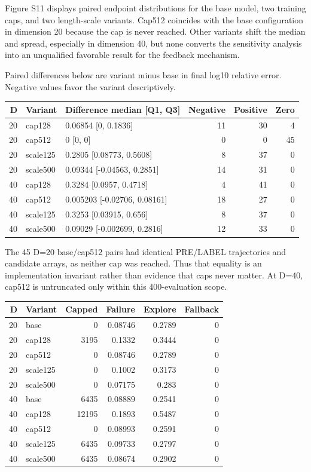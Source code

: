 \documentclass[cmc,article,submit,moreauthors,pdftex]{Definitions/tsp}
\begin{document}
Figure S11 displays paired endpoint distributions for the base model, two training caps, and two length-scale variants. Cap512 coincides with the base configuration in dimension 20 because the cap is never reached. Other variants shift the median and spread, especially in dimension 40, but none converts the sensitivity analysis into an unqualified favorable result for the feedback mechanism.

Paired differences below are variant minus base in final log10 relative error. Negative values favor the variant descriptively.

\begin{longtable}[]{@{}rllrrr@{}}
\toprule
D & Variant & Difference median {[}Q1, Q3{]} & Negative & Positive & Zero \\
\midrule
\endhead
20 & cap128 & 0.06854 {[}0, 0.1836{]} & 11 & 30 & 4 \\
20 & cap512 & 0 {[}0, 0{]} & 0 & 0 & 45 \\
20 & scale125 & 0.2805 {[}0.08773, 0.5608{]} & 8 & 37 & 0 \\
20 & scale500 & 0.09344 {[}-0.04563, 0.2851{]} & 14 & 31 & 0 \\
40 & cap128 & 0.3284 {[}0.0957, 0.4718{]} & 4 & 41 & 0 \\
40 & cap512 & 0.005203 {[}-0.02706, 0.08161{]} & 18 & 27 & 0 \\
40 & scale125 & 0.3253 {[}0.03915, 0.656{]} & 8 & 37 & 0 \\
40 & scale500 & 0.09029 {[}-0.002699, 0.2816{]} & 12 & 33 & 0 \\
\bottomrule
\end{longtable}

The 45 D=20 base/cap512 pairs had identical PRE/LABEL trajectories and candidate arrays, as neither cap was reached. Thus that equality is an implementation invariant rather than evidence that caps never matter. At D=40, cap512 is untruncated only within this 400-evaluation scope.

\begin{longtable}[]{@{}rlrrrr@{}}
\toprule
D & Variant & Capped & Failure & Explore & Fallback \\
\midrule
\endhead
20 & base & 0 & 0.08746 & 0.2789 & 0 \\
20 & cap128 & 3195 & 0.1332 & 0.3444 & 0 \\
20 & cap512 & 0 & 0.08746 & 0.2789 & 0 \\
20 & scale125 & 0 & 0.1002 & 0.3173 & 0 \\
20 & scale500 & 0 & 0.07175 & 0.283 & 0 \\
40 & base & 6435 & 0.08889 & 0.2541 & 0 \\
40 & cap128 & 12195 & 0.1893 & 0.5487 & 0 \\
40 & cap512 & 0 & 0.08993 & 0.2591 & 0 \\
40 & scale125 & 6435 & 0.09733 & 0.2797 & 0 \\
40 & scale500 & 6435 & 0.08674 & 0.2902 & 0 \\
\bottomrule
\end{longtable}
\end{document}
